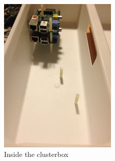 \begin{figure}[h]
	\centering
    \includegraphics[width=0.5\textwidth]{thebuild/cluster_inside.jpg}
    \caption{Inside the clusterbox}
    \label{fig:build_cluster_inside}
\end{figure}



